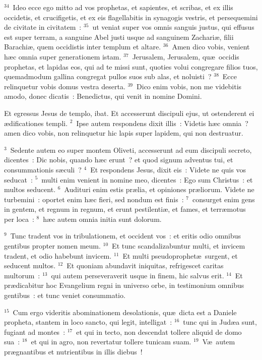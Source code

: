 ${}^{34}$~Ideo ecce ego mitto ad vos prophetas, et sapientes, et scribas, et ex illis occidetis, et crucifigetis, et ex eis flagellabitis in synagogis vestris, et persequemini de civitate in civitatem~:
${}^{35}$~ut veniat super vos omnis sanguis justus, qui effusus est super terram, a sanguine Abel justi usque ad sanguinem Zachari\ae , filii Barachi\ae , quem occidistis inter templum et altare.
${}^{36}$~Amen dico vobis, venient h\ae c omnia super generationem istam.
${}^{37}$~Jerusalem, Jerusalem, qu\ae\ occidis prophetas, et lapidas eos, qui ad te missi sunt, quoties volui congregare filios tuos, quemadmodum gallina congregat pullos suos sub alas, et noluisti~?
${}^{38}$~Ecce relinquetur vobis domus vestra deserta.
${}^{39}$~Dico enim vobis, non me videbitis amodo, donec dicatis~: Benedictus, qui venit in nomine Domini.

\lettrine[lines=10,image=true,loversize=0.05,lraise=-0.03]{E}{}t egressus Jesus de templo, ibat. Et accesserunt discipuli ejus, ut ostenderent ei \ae dificationes templi.
${}^{2}$~Ipse autem respondens dixit illis~: Videtis h\ae c omnia~? amen dico vobis, non relinquetur hic lapis super lapidem, qui non destruatur.


${}^{3}$~Sedente autem eo super montem Oliveti, accesserunt ad eum discipuli secreto, dicentes~: Dic nobis, quando h\ae c erunt~? et quod signum adventus tui, et consummationis s\ae culi~?
${}^{4}$~Et respondens Jesus, dixit eis~: Videte ne quis vos seducat~:
${}^{5}$~multi enim venient in nomine meo, dicentes~: Ego sum Christus~: et multos seducent.
${}^{6}$~Audituri enim estis pr\ae lia, et opiniones pr\ae liorum. Videte ne turbemini~: oportet enim h\ae c fieri, sed nondum est finis~:
${}^{7}$~consurget enim gens in gentem, et regnum in regnum, et erunt pestilenti\ae , et fames, et terr\ae motus per loca~:
${}^{8}$~h\ae c autem omnia initia sunt dolorum.


${}^{9}$~Tunc tradent vos in tribulationem, et occident vos~: et eritis odio omnibus gentibus propter nomen meum.
${}^{10}$~Et tunc scandalizabuntur multi, et invicem tradent, et odio habebunt invicem.
${}^{11}$~Et multi pseudoprophet\ae\ surgent, et seducent multos.
${}^{12}$~Et quoniam abundavit iniquitas, refrigescet caritas multorum~:
${}^{13}$~qui autem perseveraverit usque in finem, hic salvus erit.
${}^{14}$~Et pr\ae dicabitur hoc Evangelium regni in universo orbe, in testimonium omnibus gentibus~: et tunc veniet consummatio.


${}^{15}$~Cum ergo videritis abominationem desolationis, qu\ae\ dicta est a Daniele propheta, stantem in loco sancto, qui legit, intelligat~:
${}^{16}$~tunc qui in Jud\ae a sunt, fugiant ad montes~:
${}^{17}$~et qui in tecto, non descendat tollere aliquid de domo sua~:
${}^{18}$~et qui in agro, non revertatur tollere tunicam suam.
${}^{19}$~V\ae\ autem pr\ae gnantibus et nutrientibus in illis diebus~!


